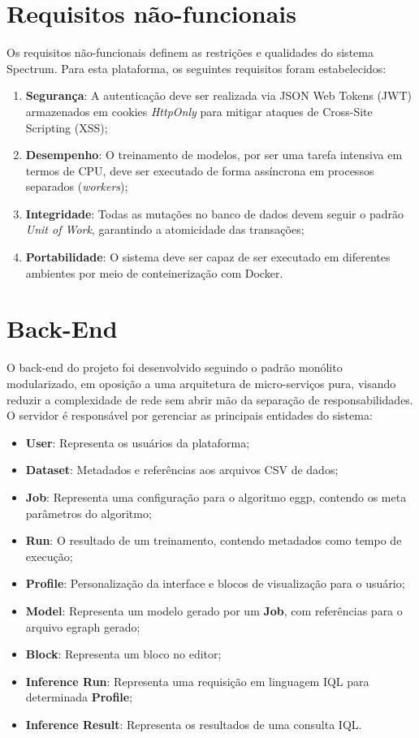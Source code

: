 \section{Requisitos não-funcionais}
Os requisitos não-funcionais definem as restrições e qualidades do sistema Spectrum. Para esta plataforma, os seguintes requisitos foram estabelecidos:
\begin{enumerate}
    \item \textbf{Segurança}: A autenticação deve ser realizada via JSON Web Tokens (JWT) armazenados em cookies \textit{HttpOnly} para mitigar ataques de Cross-Site Scripting (XSS);
    \item \textbf{Desempenho}: O treinamento de modelos, por ser uma tarefa intensiva em termos de CPU, deve ser executado de forma assíncrona em processos separados (\textit{workers});
    \item \textbf{Integridade}: Todas as mutações no banco de dados devem seguir o padrão \textit{Unit of Work}, garantindo a atomicidade das transações;
    \item \textbf{Portabilidade}: O sistema deve ser capaz de ser executado em diferentes ambientes por meio de conteinerização com Docker.
\end{enumerate}

\section{Back-End}
O back-end do projeto foi desenvolvido seguindo o padrão monólito modularizado, em oposição a uma arquitetura de micro-serviços pura, visando reduzir a complexidade de rede sem abrir mão da separação de responsabilidades. O servidor é responsável por gerenciar as principais entidades do sistema:
\begin{itemize}
    \item \textbf{User}: Representa os usuários da plataforma;
    \item \textbf{Dataset}: Metadados e referências aos arquivos CSV de dados;
    \item \textbf{Job}: Representa uma configuração para o algoritmo eggp, contendo os meta parâmetros do algoritmo;
    \item \textbf{Run}: O resultado de um treinamento, contendo metadados como tempo de execução;
    \item \textbf{Profile}: Personalização da interface e blocos de visualização para o usuário;
    \item \textbf{Model}: Representa um modelo gerado por um \textbf{Job}, com referências para o arquivo egraph gerado;
    \item \textbf{Block}: Representa um bloco no editor;
    \item \textbf{Inference Run}: Representa uma requisição em linguagem IQL para determinada \textbf{Profile};
    \item \textbf{Inference Result}: Representa os resultados de uma consulta IQL.
\end{itemize}

